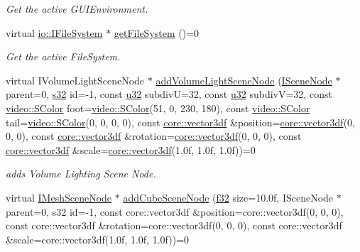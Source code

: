 \begin{DoxyCompactItemize}
\begin{DoxyCompactList}\small\item\em Get the active G\+U\+I\+Environment. \end{DoxyCompactList}\item 
virtual \hyperlink{classirr_1_1io_1_1IFileSystem}{io\+::\+I\+File\+System} $\ast$ \hyperlink{classirr_1_1scene_1_1ISceneManager_adbd98fbeba199005cf795a5bae7ccbaf}{get\+File\+System} ()=0
\begin{DoxyCompactList}\small\item\em Get the active File\+System. \end{DoxyCompactList}\item 
virtual I\+Volume\+Light\+Scene\+Node $\ast$ \hyperlink{classirr_1_1scene_1_1ISceneManager_a75fc84dd6ee9140da8fd63357947c724}{add\+Volume\+Light\+Scene\+Node} (\hyperlink{classirr_1_1scene_1_1ISceneNode}{I\+Scene\+Node} $\ast$parent=0, \hyperlink{namespaceirr_ac66849b7a6ed16e30ebede579f9b47c6}{s32} id=-\/1, const \hyperlink{namespaceirr_a0416a53257075833e7002efd0a18e804}{u32} subdivU=32, const \hyperlink{namespaceirr_a0416a53257075833e7002efd0a18e804}{u32} subdivV=32, const \hyperlink{classirr_1_1video_1_1SColor}{video\+::\+S\+Color} foot=\hyperlink{classirr_1_1video_1_1SColor}{video\+::\+S\+Color}(51, 0, 230, 180), const \hyperlink{classirr_1_1video_1_1SColor}{video\+::\+S\+Color} tail=\hyperlink{classirr_1_1video_1_1SColor}{video\+::\+S\+Color}(0, 0, 0, 0), const \hyperlink{namespaceirr_1_1core_ae6e2b2a6c552833ebbd5b7463d03586b}{core\+::vector3df} \&position=\hyperlink{namespaceirr_1_1core_ae6e2b2a6c552833ebbd5b7463d03586b}{core\+::vector3df}(0, 0, 0), const \hyperlink{namespaceirr_1_1core_ae6e2b2a6c552833ebbd5b7463d03586b}{core\+::vector3df} \&rotation=\hyperlink{namespaceirr_1_1core_ae6e2b2a6c552833ebbd5b7463d03586b}{core\+::vector3df}(0, 0, 0), const \hyperlink{namespaceirr_1_1core_ae6e2b2a6c552833ebbd5b7463d03586b}{core\+::vector3df} \&scale=\hyperlink{namespaceirr_1_1core_ae6e2b2a6c552833ebbd5b7463d03586b}{core\+::vector3df}(1.\+0f, 1.\+0f, 1.\+0f))=0
\begin{DoxyCompactList}\small\item\em adds Volume Lighting Scene Node. \end{DoxyCompactList}\item 
virtual \hyperlink{classirr_1_1scene_1_1IMeshSceneNode}{I\+Mesh\+Scene\+Node} $\ast$ \hyperlink{classirr_1_1scene_1_1ISceneManager_a23d1328c68b1585f613108f386fabc1c}{add\+Cube\+Scene\+Node} (\hyperlink{namespaceirr_a0277be98d67dc26ff93b1a6a1d086b07}{f32} size=10.\+0f, I\+Scene\+Node $\ast$parent=0, s32 id=-\/1, const core\+::vector3df \&position=core\+::vector3df(0, 0, 0), const core\+::vector3df \&rotation=core\+::vector3df(0, 0, 0), const core\+::vector3df \&scale=core\+::vector3df(1.\+0f, 1.\+0f, 1.\+0f))=0

\end{DoxyCompactItemize}
